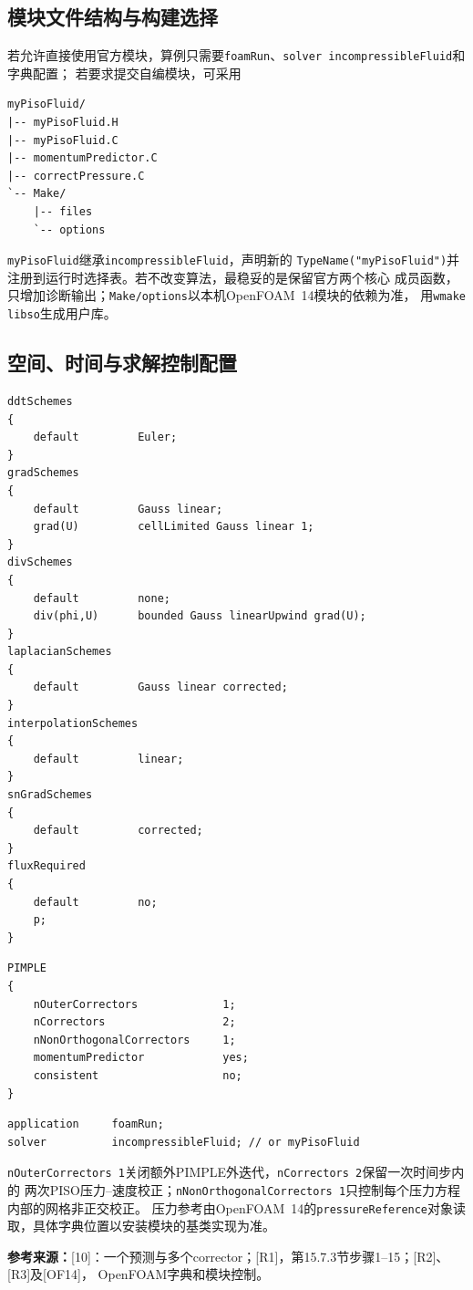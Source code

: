 \documentclass[UTF8,12pt,a4paper]{ctexart}
\numberwithin{equation}{section}
\newcommand{\Issa}{\textnormal{[10]}}
\newcommand{\Rone}{\textnormal{[R1]}}
\newcommand{\Rtwo}{\textnormal{[R2]}}
\newcommand{\Rthree}{\textnormal{[R3]}}
\newcommand{\OFfourteen}{\textnormal{[OF14]}}
\newcommand{\source}[1]{\par\smallskip\noindent\colorbox{sourcebg}{%
  \parbox{0.955\linewidth}{\footnotesize\color{sourcegray}\textbf{参考来源：}#1}}\par\smallskip}
\begin{document}
\subsection{模块文件结构与构建选择}
若允许直接使用官方模块，算例只需要\texttt{foamRun}、\texttt{solver incompressibleFluid}和字典配置；
若要求提交自编模块，可采用
\begin{lstlisting}[style=foam]
myPisoFluid/
|-- myPisoFluid.H
|-- myPisoFluid.C
|-- momentumPredictor.C
|-- correctPressure.C
`-- Make/
    |-- files
    `-- options
\end{lstlisting}
\texttt{myPisoFluid}继承\texttt{incompressibleFluid}，声明新的
\texttt{TypeName("myPisoFluid")}并注册到运行时选择表。若不改变算法，最稳妥的是保留官方两个核心
成员函数，只增加诊断输出；\texttt{Make/options}以本机OpenFOAM~14模块的依赖为准，
用\texttt{wmake libso}生成用户库。

\subsection{空间、时间与求解控制配置}
\begin{lstlisting}[style=foam]
ddtSchemes
{
    default         Euler;
}
gradSchemes
{
    default         Gauss linear;
    grad(U)         cellLimited Gauss linear 1;
}
divSchemes
{
    default         none;
    div(phi,U)      bounded Gauss linearUpwind grad(U);
}
laplacianSchemes
{
    default         Gauss linear corrected;
}
interpolationSchemes
{
    default         linear;
}
snGradSchemes
{
    default         corrected;
}
fluxRequired
{
    default         no;
    p;
}
\end{lstlisting}

\begin{lstlisting}[style=foam]
PIMPLE
{
    nOuterCorrectors             1;
    nCorrectors                  2;
    nNonOrthogonalCorrectors     1;
    momentumPredictor            yes;
    consistent                   no;
}
\end{lstlisting}
\begin{lstlisting}[style=foam]
application     foamRun;
solver          incompressibleFluid; // or myPisoFluid
\end{lstlisting}
\texttt{nOuterCorrectors 1}关闭额外PIMPLE外迭代，\texttt{nCorrectors 2}保留一次时间步内的
两次PISO压力--速度校正；\texttt{nNonOrthogonalCorrectors 1}只控制每个压力方程内部的网格非正交校正。
压力参考由OpenFOAM~14的\texttt{pressureReference}对象读取，具体字典位置以安装模块的基类实现为准。
\source{\Issa：一个预测与多个corrector；\Rone，第15.7.3节步骤1--15；\Rtwo、\Rthree{}及\OFfourteen，
OpenFOAM字典和模块控制。}
\end{document}
